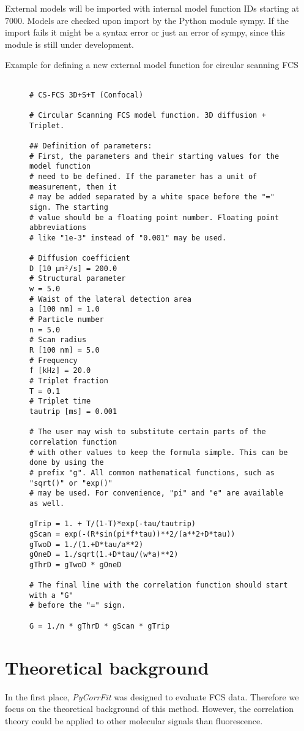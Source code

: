 External models will be imported with internal model function IDs starting at $7000$. Models are checked upon import by the Python module sympy. If the import fails it might be a syntax error or just an error of sympy, since this module is still under development.

Example for defining a new external model function for circular scanning FCS
\begin{figure}
\begin{Verbatim}[frame = single]

# CS-FCS 3D+S+T (Confocal)

# Circular Scanning FCS model function. 3D diffusion + Triplet.

## Definition of parameters:
# First, the parameters and their starting values for the model function
# need to be defined. If the parameter has a unit of measurement, then it 
# may be added separated by a white space before the "=" sign. The starting
# value should be a floating point number. Floating point abbreviations 
# like "1e-3" instead of "0.001" may be used.

# Diffusion coefficient
D [10 µm²/s] = 200.0
# Structural parameter
w = 5.0
# Waist of the lateral detection area
a [100 nm] = 1.0
# Particle number
n = 5.0
# Scan radius
R [100 nm] = 5.0
# Frequency
f [kHz] = 20.0
# Triplet fraction
T = 0.1
# Triplet time
tautrip [ms] = 0.001

# The user may wish to substitute certain parts of the correlation function
# with other values to keep the formula simple. This can be done by using the
# prefix "g". All common mathematical functions, such as "sqrt()" or "exp()"
# may be used. For convenience, "pi" and "e" are available as well.

gTrip = 1. + T/(1-T)*exp(-tau/tautrip)
gScan = exp(-(R*sin(pi*f*tau))**2/(a**2+D*tau))
gTwoD = 1./(1.+D*tau/a**2)
gOneD = 1./sqrt(1.+D*tau/(w*a)**2)
gThrD = gTwoD * gOneD

# The final line with the correlation function should start with a "G"
# before the "=" sign.

G = 1./n * gThrD * gScan * gTrip

\end{Verbatim}
\end{figure}


\section{Theoretical background}
\label{sec:theor}
In the first place, \textit{PyCorrFit} was designed to evaluate FCS data. Therefore we focus on the theoretical background of this method. However, the correlation theory could be applied to other molecular signals than fluorescence.

